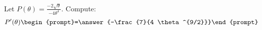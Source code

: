 \documentclass{ximera}
\author{Bart Snapp}
\begin{document}
\begin{exercise}
Let $P(\theta) = \frac{ -2 \sqrt{\theta }}{-4 \theta ^4}$. Compute:
\[
P'(\theta)
\begin{prompt}=\answer{-\frac{7}{4 \theta ^{9/2}}}\end{prompt}
\]
\end{exercise}
\end{document}
